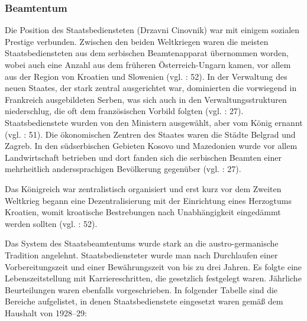 \subsubsection{Beamtentum}
Die Position des Staatsbediensteten (Drzavni Cinovnik) war mit einigem sozialen Prestige verbunden. Zwischen den beiden Weltkriegen waren die meisten Staatsbediensteten aus dem serbischen Beamtenapparat übernommen worden, wobei auch eine Anzahl aus dem früheren Österreich-Ungarn kamen, vor allem aus der Region von Kroatien und Slowenien (vgl. \cite{sevic} : 52). In der Verwaltung des neuen Staates, der stark zentral ausgerichtet war, dominierten die vorwiegend in Frankreich ausgebildeten Serben, was sich auch in den Verwaltungsstrukturen niederschlug, die oft dem französischen Vorbild folgten (vgl. \cite{beardradin} : 27). Staatsbedienstete wurden von den Ministern ausgewählt, aber vom König ernannt (vgl. \cite{sevic} : 51). Die ökonomischen Zentren des Staates waren die Städte Belgrad und Zagreb. In den südserbischen Gebieten Kosovo und Mazedonien wurde vor allem Landwirtschaft betrieben und dort fanden sich die serbischen Beamten einer mehrheitlich anderssprachigen Bevölkerung gegenüber (vgl.\cite{beardradin} : 27).\par
Das Königreich war zentralistisch organisiert und erst kurz vor dem Zweiten Weltkrieg begann eine Dezentralisierung mit der Einrichtung eines Herzogtums Kroatien, womit kroatische Bestrebungen nach Unabhängigkeit eingedämmt werden sollten (vgl. \cite{sevic} : 52).\par
Das System des Staatsbeamtentums wurde stark an die austro-germanische Tradition angelehnt. Staatsbediensteter wurde man nach Durchlaufen einer Vorbereitungszeit und einer Bewährungszeit von bis zu drei Jahren. Es folgte eine Lebenszeitstellung mit Karriereschritten, die gesetzlich festgelegt waren. Jährliche Beurteilungen waren ebenfalls vorgeschrieben. In folgender Tabelle sind die Bereiche aufgelistet, in denen Staatsbedienstete eingesetzt waren gemäß dem Haushalt von 1928–29:
